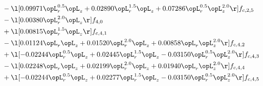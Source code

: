 \begin{alignat}{2}
& - \l[  0.09971 \opL_r^{0.5} \opL_z +  0.02890 \opL_r^{1.5} \opL_z +  0.07286 \opL_r^{0.5} \opL_z^{2.0}  \r] f_{c,2,5} \nonumber \\ 
& - \l[  0.00380 \opL_r^{2.0} \opL_z  \r] f_{4,0} \nonumber \\ 
& + \l[  0.00815 \opL_r^{1.5} \opL_z  \r] f_{c,4,1} \nonumber \\ 
& - \l[  0.01124 \opL_r \opL_z +  0.01520 \opL_r^{2.0} \opL_z +  0.00858 \opL_r \opL_z^{2.0}  \r] f_{c,4,2} \nonumber \\ 
& + \l[  -0.02244 \opL_r^{0.5} \opL_z +  0.02445 \opL_r^{1.5} \opL_z   -0.03150 \opL_r^{0.5} \opL_z^{2.0}  \r] f_{c,4,3} \nonumber \\ 
& - \l[  0.02248 \opL_r \opL_z +  0.02199 \opL_r^{2.0} \opL_z +  0.01940 \opL_r \opL_z^{2.0}  \r] f_{c,4,4} \nonumber \\ 
& + \l[  -0.02244 \opL_r^{0.5} \opL_z +  0.02277 \opL_r^{1.5} \opL_z   -0.03150 \opL_r^{0.5} \opL_z^{2.0}  \r] f_{c,4,5} \nonumber \\ 
\end{alignat} 


